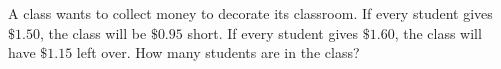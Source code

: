 A class wants to collect money to decorate its classroom. If every student gives $\$1.50$, the class will be $\$0.95$ short. If every student gives $\$1.60$, the class will have $\$1.15$ left over. How many students are in the class?
